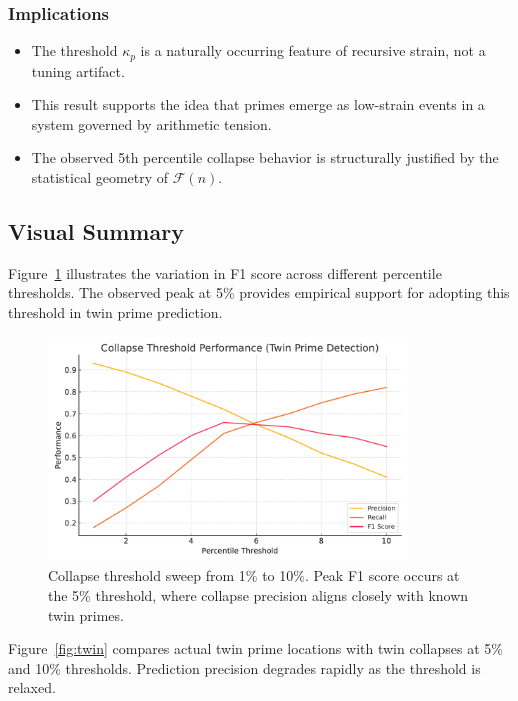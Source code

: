 \documentclass[11pt]{article}
\begin{document}
\subsubsection*{Implications}
\begin{itemize}
    \item The threshold $\kappa_p$ is a naturally occurring feature of recursive strain, not a tuning artifact.
    \item This result supports the idea that primes emerge as low-strain events in a system governed by arithmetic tension.
    \item The observed 5th percentile collapse behavior is structurally justified by the statistical geometry of \(\mathcal{F}(n)\).
\end{itemize}


\subsection{Visual Summary}

Figure~\ref{fig:threshold} illustrates the variation in F1 score across different percentile thresholds. The observed peak at 5\% provides empirical support for adopting this threshold in twin prime prediction.

\begin{figure}[H]
\centering
\includegraphics[width=0.85\textwidth]{collapse_threshold_curve.pdf}
\caption{Collapse threshold sweep from 1\% to 10\%. Peak F1 score occurs at the 5\% threshold, where collapse precision aligns closely with known twin primes.}
\label{fig:threshold}
\end{figure}

Figure~\ref{fig:twin} compares actual twin prime locations with twin collapses at 5\% and 10\% thresholds. Prediction precision degrades rapidly as the threshold is relaxed.
\end{document}
